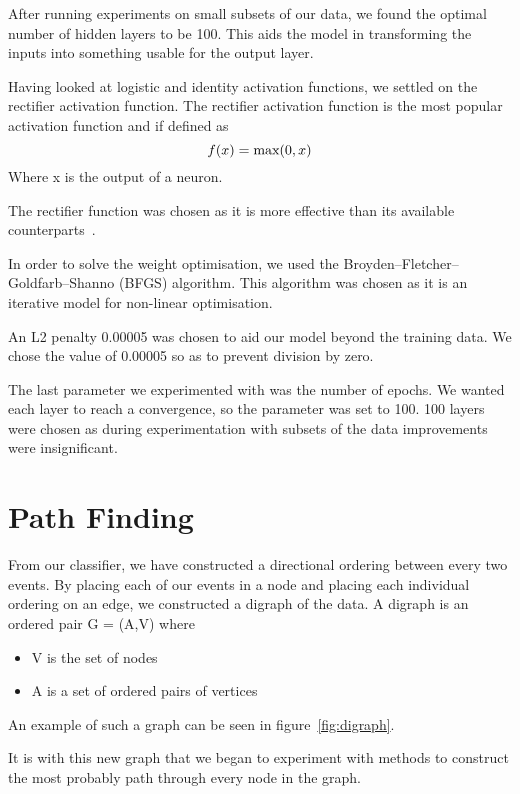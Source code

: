 \documentclass[bsc,frontabs,twoside,singlespacing,parskip,deptreport]{infthesis}     %
\begin{document}
 After running experiments on  small subsets of our data, we found the optimal number of hidden layers to be 100. 
 This aids the model in transforming the inputs into something usable for the output layer.
 
 Having looked at logistic and identity activation functions, we settled on the rectifier activation function.
 The rectifier activation function is the most popular activation function \cite{lecun2015deep} and if defined as
 \begin{equation}
   f(x) = \text{max}(0,x)\nonumber\\
 \end{equation}
 Where x is the output of a neuron.
 
 The rectifier function was chosen as it is more effective than its available counterparts~\cite{glorot2011deep}.

 In order to solve the weight optimisation, we used the Broyden–Fletcher–Goldfarb–Shanno (BFGS) algorithm.
 This algorithm was chosen as it is an iterative model for non-linear optimisation.

 An L2 penalty 0.00005 was chosen to aid our model beyond the training data.
 We chose the value of 0.00005 so as to prevent division by zero. 

 The last parameter we experimented with was the number of epochs.
 We wanted each layer to reach a convergence, so the parameter was set to 100.
 100 layers were chosen as during experimentation with subsets of the data improvements were
 insignificant.

 \section{Path Finding} \label{chapter:graphing}
From our classifier, we have constructed a directional ordering between every two events.
By placing each of our events in a node and placing each individual ordering on an edge, we constructed
a digraph of the data.
A digraph is an ordered pair G = (A,V) where~\cite{bang2008digraphs}
\begin{itemize}
  \item V is the set of nodes
  \item A is a set of ordered pairs of vertices
\end{itemize}
An example of such a graph can be seen in figure~\ref{fig:digraph}.

It is with this new graph that we began to experiment with methods to construct the most probably path through every
node in the graph.
\end{document}
